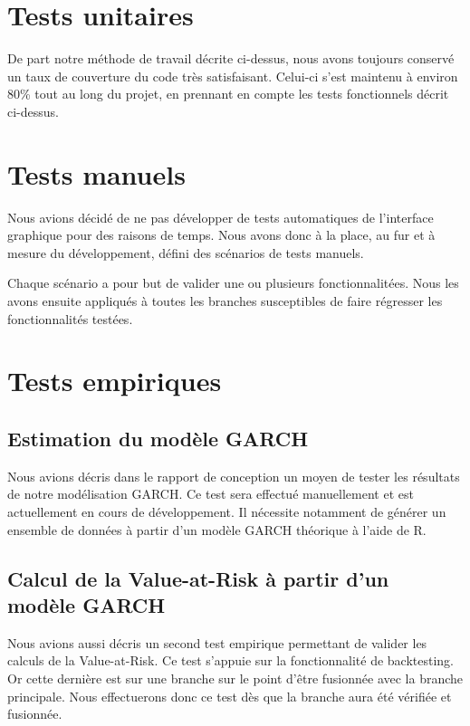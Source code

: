 \documentclass[a4paper,titlepage,french]{report}
\begin{document}
\section{Tests unitaires}

De part notre méthode de travail décrite ci-dessus, nous avons toujours conservé un taux de couverture du code très satisfaisant.
Celui-ci s'est maintenu à environ 80\% tout au long du projet, en prennant en compte les tests fonctionnels décrit ci-dessus.


\section{Tests manuels}

Nous avions décidé de ne pas développer de tests automatiques de l'interface graphique pour des raisons de temps.
Nous avons donc à la place, au fur et à mesure du développement, défini des scénarios de tests manuels.

Chaque scénario a pour but de valider une ou plusieurs fonctionnalitées.
Nous les avons ensuite appliqués à toutes les branches susceptibles de faire régresser les fonctionnalités testées.


\section{Tests empiriques}

\subsection{Estimation du modèle GARCH}

Nous avions décris dans le rapport de conception un moyen de tester les résultats de notre modélisation GARCH.
Ce test sera effectué manuellement et est actuellement en cours de développement.
Il nécessite notamment de générer un ensemble de données à partir d'un modèle GARCH théorique à l'aide de R.


\subsection{Calcul de la Value-at-Risk à partir d'un modèle GARCH}

Nous avions aussi décris un second test empirique permettant de valider les calculs de la Value-at-Risk.
Ce test s'appuie sur la fonctionnalité de backtesting.
Or cette dernière est sur une branche sur le point d'être fusionnée avec la branche principale.
Nous effectuerons donc ce test dès que la branche aura été vérifiée et fusionnée.
\end{document}
